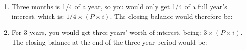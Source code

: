         \label{m39332*id69703}\begin{enumerate}[noitemsep, label=\textbf{\arabic*}. ] 
            \label{m39332*uid32}\item Three months is 1/4 of a year, so you would only get 1/4 of a full year's interest, which is: $1/4\ensuremath{\times}\left(P\ensuremath{\times}i\right)$. The closing balance would therefore be:
\label{m39332*id69748}\nopagebreak\noindent{}
    \label{m39332*uid33}\item For 3 years, you would get three years' worth of interest, being: $3\ensuremath{\times}\left(P\ensuremath{\times}i\right)$. The closing balance at the end of the three year period would be:
\label{m39332*id69871}\nopagebreak\noindent{}\settowidth{\mymathboxwidth}{\begin{equation}

\end{equation}}
\end{enumerate}
